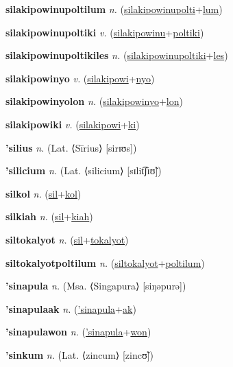 \textbf{\hypertarget{silakipowinupoltilum}{silakipowinupoltilum}} \textit{n.} (\hyperlink{silakipowinupolti}{silakipowinupolti}+\allowbreak \hyperlink{lum}{lum})


\textbf{\hypertarget{silakipowinupoltiki}{silakipowinupoltiki}} \textit{v.} (\hyperlink{silakipowinu}{silakipowinu}+\allowbreak \hyperlink{poltiki}{poltiki})


\textbf{\hypertarget{silakipowinupoltikiles}{silakipowinupoltikiles}} \textit{n.} (\hyperlink{silakipowinupoltiki}{silakipowinupoltiki}+\allowbreak \hyperlink{les}{les})


\textbf{\hypertarget{silakipowinyo}{silakipowinyo}} \textit{v.} (\hyperlink{silakipowi}{silakipowi}+\allowbreak \hyperlink{nyo}{nyo})


\textbf{\hypertarget{silakipowinyolon}{silakipowinyolon}} \textit{n.} (\hyperlink{silakipowinyo}{silakipowinyo}+\allowbreak \hyperlink{lon}{lon})


\textbf{\hypertarget{silakipowiki}{silakipowiki}} \textit{v.} (\hyperlink{silakipowi}{silakipowi}+\allowbreak \hyperlink{ki}{ki})


\textbf{\hypertarget{'silius}{'silius}} \textit{n.} (Lat. ⟨Sīrius⟩ [sirɪʊs])


\textbf{\hypertarget{'silicium}{'silicium}} \textit{n.} (Lat. ⟨silicium⟩ [sɪlit͡ʃɪʊ̃])


\textbf{\hypertarget{silkol}{silkol}} \textit{n.} (\hyperlink{sil}{sil}+\allowbreak \hyperlink{kol}{kol})


\textbf{\hypertarget{silkiah}{silkiah}} \textit{n.} (\hyperlink{sil}{sil}+\allowbreak \hyperlink{kiah}{kiah})


\textbf{\hypertarget{siltokalyot}{siltokalyot}} \textit{n.} (\hyperlink{sil}{sil}+\allowbreak \hyperlink{tokalyot}{tokalyot})


\textbf{\hypertarget{siltokalyotpoltilum}{siltokalyotpoltilum}} \textit{n.} (\hyperlink{siltokalyot}{siltokalyot}+\allowbreak \hyperlink{poltilum}{poltilum})


\textbf{\hypertarget{'sinapula}{'sinapula}} \textit{n.} (Msa. ⟨Singapura⟩ [siŋəpurə])


\textbf{\hypertarget{'sinapulaak}{'sinapulaak}} \textit{n.} (\hyperlink{'sinapula}{'sinapula}+\allowbreak \hyperlink{ak}{ak})


\textbf{\hypertarget{'sinapulawon}{'sinapulawon}} \textit{n.} (\hyperlink{'sinapula}{'sinapula}+\allowbreak \hyperlink{won}{won})


\textbf{\hypertarget{'sinkum}{'sinkum}} \textit{n.} (Lat. ⟨zincum⟩ [zincʊ̃])


